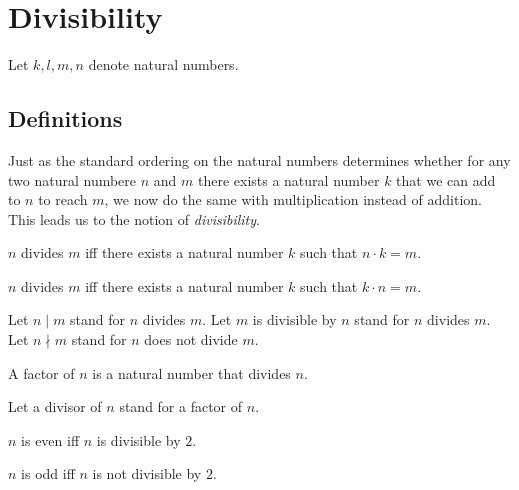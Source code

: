 \documentclass[../../arithmetic.ftl.tex]{subfiles}
\begin{document}
  \section{Divisibility}

  \begin{forthel}
  \end{forthel}

  \begin{forthel}
  \end{forthel}

  \begin{forthel}
  \end{forthel}

  \begin{forthel}
    Let $k, l, m, n$ denote natural numbers.
  \end{forthel}


  \subsection{Definitions}

  Just as the standard ordering on the natural numbers determines whether for
  any two natural numbere $n$ and $m$ there exists a natural number $k$ that we
  can add to $n$ to reach $m$, we now do the same with multiplication instead of
  addition. This leads us to the notion of \textit{divisibility}.

  \begin{forthel}
    \begin{definition}
      $n$ divides $m$ iff there exists a natural number $k$ such that $n \cdot k = m$.
    \end{definition}

    \begin{lemma}\label{Arithmetic_03_01_926592}
      $n$ divides $m$ iff there exists a natural number $k$ such that $k \cdot n = m$.
    \end{lemma}

    Let $n \mid m$ stand for $n$ divides $m$.
    Let $m$ is divisible by $n$ stand for $n$ divides $m$.
    Let $n \nmid m$ stand for $n$ does not divide $m$.

    \begin{definition}
      A factor of $n$ is a natural number that divides $n$.
    \end{definition}

    Let a divisor of $n$ stand for a factor of $n$.

    \begin{definition}
      $n$ is even iff $n$ is divisible by $2$.
    \end{definition}

    \begin{definition}
      $n$ is odd iff $n$ is not divisible by $2$.
    \end{definition}
  \end{forthel}
\end{document}
